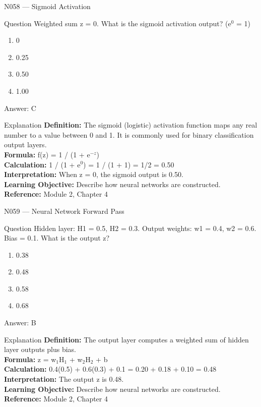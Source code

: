 \documentclass[aspectratio=169,8pt]{beamer}
\begin{document}
	\begin{frame}{N058 --- Sigmoid Activation}
		\begin{block}{Question}
			Weighted sum z = 0. What is the sigmoid activation output? (e$^{0}$ = 1)
			\begin{enumerate}
				\item 0
				\item 0.25
				\item 0.50
				\item 1.00
			\end{enumerate}
		\end{block}
		\begin{exampleblock}{Answer: C}\end{exampleblock}
		\begin{block}{Explanation}
			\textbf{Definition:} The sigmoid (logistic) activation function maps any real number to a value between 0 and 1. It is commonly used for binary classification output layers.\\
			\textbf{Formula:} f(z) = 1 / (1 + e$^{-z}$)\\
			\textbf{Calculation:} 1 / (1 + e$^{0}$) = 1 / (1 + 1) = 1/2 = 0.50\\
			\textbf{Interpretation:} When z = 0, the sigmoid output is 0.50.\\
			\textbf{Learning Objective:} Describe how neural networks are constructed.\\
			\textbf{Reference:} Module 2, Chapter 4
		\end{block}
	\end{frame}
	
	\begin{frame}{N059 --- Neural Network Forward Pass}
		\begin{block}{Question}
			Hidden layer: H1 = 0.5, H2 = 0.3. Output weights: w1 = 0.4, w2 = 0.6. Bias = 0.1. What is the output z?
			\begin{enumerate}
				\item 0.38
				\item 0.48
				\item 0.58
				\item 0.68
			\end{enumerate}
		\end{block}
		\begin{exampleblock}{Answer: B}\end{exampleblock}
		\begin{block}{Explanation}
			\textbf{Definition:} The output layer computes a weighted sum of hidden layer outputs plus bias.\\
			\textbf{Formula:} z = w$_{1}$H$_{1}$ + w$_{2}$H$_{2}$ + b\\
			\textbf{Calculation:} 0.4(0.5) + 0.6(0.3) + 0.1 = 0.20 + 0.18 + 0.10 = 0.48\\
			\textbf{Interpretation:} The output z is 0.48.\\
			\textbf{Learning Objective:} Describe how neural networks are constructed.\\
			\textbf{Reference:} Module 2, Chapter 4
		\end{block}
	\end{frame}
	
\end{document}
